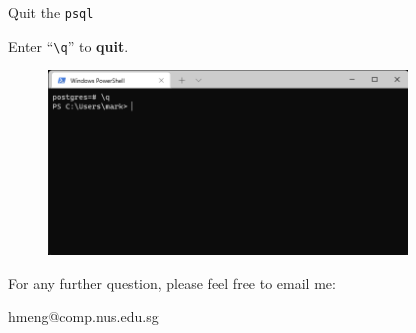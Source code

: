 \begin{frame}[fragile]{Quit the \texttt{psql}}
	
	Enter ``\texttt{\textbackslash q}'' to \textbf{quit}.
	\begin{figure}
		\includegraphics[width=0.85\textwidth]{t0-psql/images/12.png}
	\end{figure}
	
\end{frame}
\begin{frame}{}
\centering  
For any further question, please feel free to email me:\vspace{10pt}

hmeng@comp.nus.edu.sg \vspace{20pt}

\end{frame}